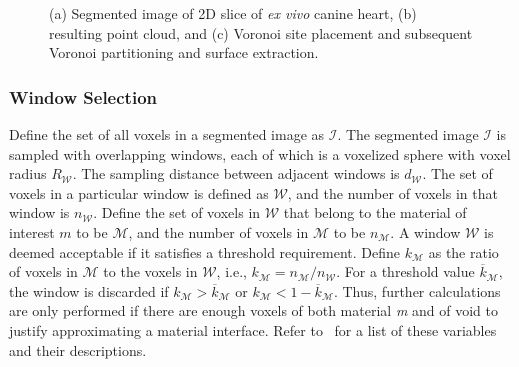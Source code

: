 \begin{figure}
{\label{fig:d2dvor2}}
%
\caption{(a) Segmented image of 2D slice of \textit{ex vivo} canine heart, (b) resulting point cloud, and (c) Voronoi site placement and subsequent Voronoi partitioning and surface extraction.}
\label{fig:d2dvor}
\end{figure}

\subsubsection{Window Selection}

Define the set of all voxels in a segmented image as $\mathcal{I}$. The segmented image  $\mathcal{I}$ is sampled with overlapping windows, each of which is a voxelized sphere with voxel radius $R_{\mathcal{W}}$. The sampling distance between adjacent windows is $d_{\mathcal{W}}$. The set of voxels in a particular window is defined as $\mathcal{W}$, and the number of voxels in that window is $n_{\mathcal{W}}$. Define the set of voxels in $\mathcal{W}$ that belong to the material of interest $m$ to be $\mathcal{M}$, and the number of voxels in $\mathcal{M}$ to be $n_{\mathcal{M}}$. A window $\mathcal{W}$ is deemed acceptable if it satisfies a threshold requirement. Define $k_{\mathcal{M}}$ as the ratio of voxels in $\mathcal{M}$ to the voxels in $\mathcal{W}$, i.e., $k_{\mathcal{M}} = n_{\mathcal{M}}/n_{\mathcal{W}}$. For a threshold value $\overline{k}_{\mathcal{M}}$, the window is discarded if $k_{\mathcal{M}} > \overline{k}_{\mathcal{M}}$ or $k_{\mathcal{M}} < 1 - \overline{k}_{\mathcal{M}}$. Thus, further calculations are only performed if there are enough voxels of both material \textit{m} and of void to justify approximating a material interface. Refer to~ for a list of these variables and their descriptions. 

